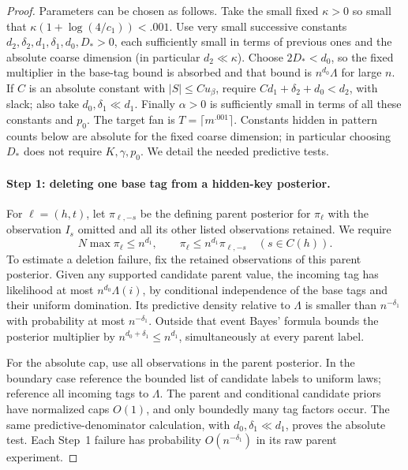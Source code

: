 \begin{proof}
Parameters can be chosen as follows. Take the small fixed \(\kappa>0\) so small that \(\kappa(1+\log(4/c_1))<.001\). Use very small successive constants \(d_2,\delta_2,d_1,\delta_1,d_0,D_*>0\), each sufficiently small in terms of previous ones and the absolute coarse dimension (in particular \(d_2\ll\kappa\)). Choose \(2D_*<d_0\), so the fixed multiplier in the base-tag bound is
absorbed and that bound is \(n^{d_0}\Lambda\) for large \(n\).
If \(C\) is an absolute constant with \(|S|\le C u_\beta\), require
\(C d_1+\delta_2+d_0<d_2\), with slack; also take
\(d_0,\delta_1\ll d_1\). Finally \(\alpha>0\) is sufficiently small in terms of all these constants and \(p_0\). The target fan is \(T=\lceil m^{.001}\rceil\). Constants hidden in pattern counts below are absolute for the fixed coarse dimension; in particular choosing \(D_*\) does not require \(K,\gamma,p_0\). We detail the needed predictive tests.

\paragraph{Step 1: deleting one base tag from a hidden-key posterior.}
For \(\ell=(h,t)\), let \(\pi_{\ell,-s}\) be the defining parent
posterior for \(\pi_\ell\) with the observation \(I_s\) omitted and all
its other listed observations retained. We require
\[
 N\max\pi_\ell\le n^{d_1},\qquad
 \pi_\ell\le n^{d_1}\pi_{\ell,-s}\quad(s\in C(h)).
\]
To estimate a deletion failure, fix the retained observations of this
parent posterior. Given any supported candidate parent value, the
incoming tag has likelihood at most \(n^{d_0}\Lambda(i)\), by
conditional independence of the base tags and their uniform domination.
Its predictive density relative to \(\Lambda\) is smaller than
\(n^{-\delta_1}\) with probability at most \(n^{-\delta_1}\).
Outside that event Bayes' formula bounds the posterior multiplier by
\(n^{d_0+\delta_1}\le n^{d_1}\), simultaneously at every parent label.

For the absolute cap, use all observations in the parent posterior.
In the boundary case reference the bounded list of candidate labels to
uniform laws; reference all incoming tags to \(\Lambda\). The parent
and conditional candidate priors have normalized caps \(O(1)\), and
only boundedly many tag factors occur. The same predictive-denominator
calculation, with \(d_0,\delta_1\ll d_1\), proves the absolute test.
Each Step~1 failure has probability \(O(n^{-\delta_1})\) in its raw
parent experiment.


\end{proof}
